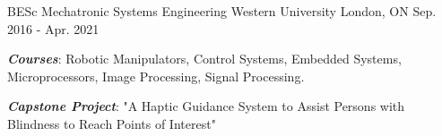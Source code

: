 

\begin{cventries}

  \cventry
    {BESc Mechatronic Systems Engineering} %
    {Western University} %
    {London, ON} %
    {Sep. 2016 - Apr. 2021} %
    {
      \begin{cvitems} %
        \item {\textbf{\textit{Courses}}: Robotic Manipulators, Control Systems, Embedded Systems, Microprocessors, Image Processing, Signal Processing.}
        \item {\textbf{\textit{Capstone Project}}: "A Haptic Guidance System to Assist Persons with Blindness to Reach Points of Interest"}
      \end{cvitems}
    }

\end{cventries}
